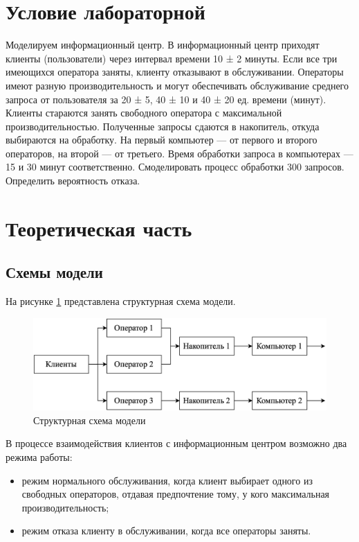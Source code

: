 \section{Условие лабораторной}

Моделируем информационный центр. В информационный центр приходят клиенты (пользователи) через интервал времени 10 ± 2 минуты. Если все три имеющихся оператора заняты, клиенту отказывают в обслуживании.
Операторы имеют разную производительность и могут обеспечивать обслуживание среднего запроса от пользователя за 20 ± 5, 40 ± 10 и 40 ± 20 ед. времени (минут).
Клиенты стараются занять свободного оператора с максимальной производительностью.
Полученные запросы сдаются в накопитель, откуда выбираются на обработку.
На первый компьютер — от первого и второго операторов, на второй --- от третьего.
Время обработки запроса в компьютерах — 15 и 30 минут соответственно.
Смоделировать процесс обработки 300 запросов. Определить вероятность отказа.

\section{Теоретическая часть}

\subsection{Схемы модели}

На рисунке \ref{img:blockDiagram} представлена структурная схема модели.

\begin{figure}[ht!]
	\centering
	\includegraphics[width=0.6\linewidth]{../img/blockDiagram.png}
	\caption{Структурная схема модели}
	\label{img:blockDiagram}
\end{figure}

В процессе взаимодействия клиентов с информационным центром возможно два режима работы:

\begin{itemize}
	\item режим нормального обслуживания, когда клиент выбирает одного из свободных операторов, отдавая предпочтение тому, у кого максимальная производительность;
	\item режим отказа клиенту в обслуживании, когда все операторы заняты.
\end{itemize}

